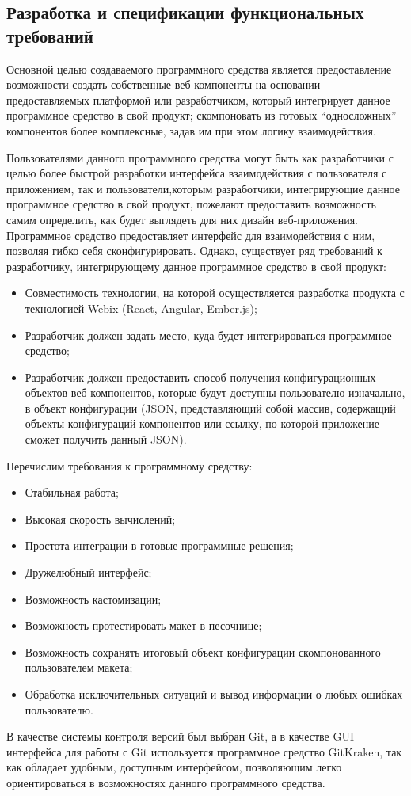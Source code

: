 \subsection{Разработка и спецификации функциональных требований}
\label{sec:analysis:specification}

Основной целью создаваемого программного средства является предоставление возможности создать собственные веб-компоненты на основании предоставляемых платформой или разработчиком, который интегрирует данное программное средство в свой продукт; скомпоновать из готовых “односложных” компонентов более комплексные, задав им при этом логику взаимодействия.
 
Пользователями данного программного средства могут быть как разработчики с целью более быстрой разработки интерфейса взаимодействия с пользователя с приложением, так и пользователи,которым разработчики, интегрирующие данное программное средство в свой продукт, пожелают предоставить возможность самим определить, как будет выглядеть для них дизайн веб-приложения.
Программное средство предоставляет интерфейс для взаимодействия с ним, позволяя гибко себя сконфигурировать. Однако, существует ряд требований к разработчику, интегрирующему данное программное средство в свой продукт:

\begin{itemize}
    \item Совместимость технологии, на которой осуществляется разработка продукта с технологией Webix (React, Angular, Ember.js);
    \item Разработчик должен задать место, куда будет интегрироваться программное средство;
    \item Разработчик должен предоставить способ получения конфигурационных объектов веб-компонентов, которые будут доступны пользователю изначально, в объект конфигурации (JSON, представляющий собой массив, содержащий объекты конфигураций компонентов или ссылку, по которой приложение сможет получить данный JSON).
\end{itemize}

Перечислим требования к программному средству:

\begin{itemize}
    \item Стабильная работа;
    \item Высокая скорость вычислений;
    \item Простота интеграции в готовые программные решения;
    \item Дружелюбный интерфейс;
    \item Возможность кастомизации;
    \item Возможность протестировать макет в песочнице;
    \item Возможность сохранять итоговый объект конфигурации скомпонованного пользователем макета;
    \item Обработка исключительных ситуаций и вывод информации о любых ошибках пользователю.
\end{itemize}

В качестве системы контроля версий был выбран Git, а в качестве GUI интерфейса для работы с Git используется программное средство GitKraken, так как обладает удобным, доступным интерфейсом, позволяющим легко ориентироваться в возможностях данного программного средства.
